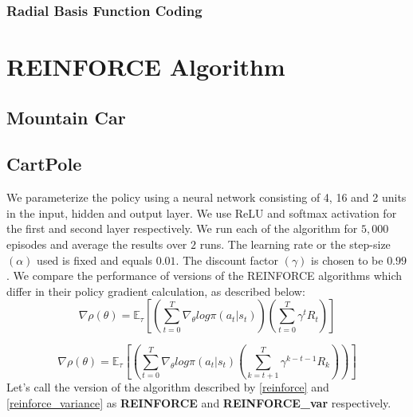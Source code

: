 \documentclass{article}
\begin{document}
        \subsubsection{Radial Basis Function Coding}

\section{REINFORCE Algorithm}
    \subsection{Mountain Car}

    \subsection{CartPole}
    We parameterize the policy using a neural network consisting of 4, 16 and 2 units in the input, hidden and output layer. We use ReLU and softmax activation for
    the first and second layer respectively. We run each of the algorithm for $5,000$ episodes and average the results over $2$ runs. 
    The learning rate or the step-size $(\alpha)$ used is fixed and equals $0.01$. The discount factor $(\gamma)$ is chosen to be $0.99$. We compare the performance
    of versions of the REINFORCE algorithms which differ in their policy gradient calculation, as described below:
    \begin{equation}
        \nabla \rho(\theta) = \mathbb{E}_{\tau} \left [\left ( \sum_{t=0}^{T} \nabla_{\theta} log \pi (a_{t} | s_{t}) \right) \left ( \sum_{t=0}^{T} \gamma^{t} R_{t} \right) \right ]
    \label{reinforce}
    \end{equation}

    \begin{equation}
        \nabla \rho(\theta) = \mathbb{E}_{\tau} \left [\left ( \sum_{t=0}^{T} \nabla_{\theta} log \pi (a_{t} | s_{t}) \left ( \sum_{k=t+1}^{T} \gamma^{k-t-1} R_{k} \right) \right) \right ]
    \label{reinforce_variance}
    \end{equation}
    Let's call the version of the algorithm described by \ref{reinforce} and \ref{reinforce_variance} as \textbf{REINFORCE} and \textbf{REINFORCE\_var} respectively. 
\end{document}
